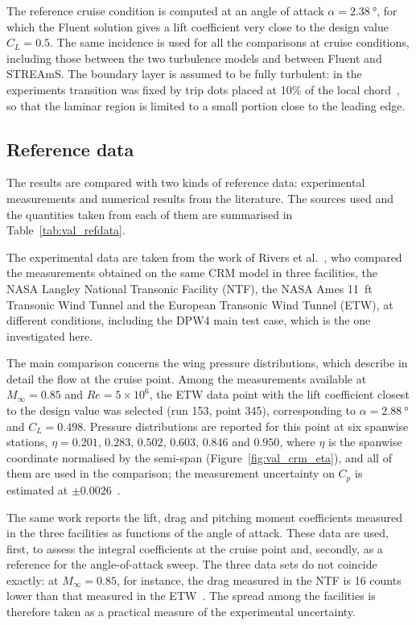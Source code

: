The reference cruise condition is computed at an angle of attack $\alpha = \SI{2.38}{\degree}$, for which the Fluent solution gives a lift coefficient very close to the design value $C_L = 0.5$. The same incidence is used for all the comparisons at cruise conditions, including those between the two turbulence models and between Fluent and STREAmS. The boundary layer is assumed to be fully turbulent: in the experiments transition was fixed by trip dots placed at 10\% of the local chord~\cite{rivers2015}, so that the laminar region is limited to a small portion close to the leading edge.

\subsection{Reference data}
\label{sec:val_refdata}

The results are compared with two kinds of reference data: experimental measurements and numerical results from the literature. The sources used and the quantities taken from each of them are summarised in Table~\ref{tab:val_refdata}.

The experimental data are taken from the work of Rivers et al.~\cite{rivers2015}, who compared the measurements obtained on the same CRM model in three facilities, the NASA Langley National Transonic Facility (NTF), the NASA Ames \SI{11}{ft} Transonic Wind Tunnel and the European Transonic Wind Tunnel (ETW), at different conditions, including the DPW4 main test case, which is the one investigated here. 

The main comparison concerns the wing pressure distributions, which describe in detail the flow at the cruise point. Among the measurements available at $M_\infty = 0.85$ and $Re = 5\times10^{6}$, the ETW data point with the lift coefficient closest to the design value was selected (run 153, point 345), corresponding to $\alpha = \SI{2.88}{\degree}$ and $C_L = 0.498$. Pressure distributions are reported for this point at six spanwise stations, $\eta = 0.201$, $0.283$, $0.502$, $0.603$, $0.846$ and $0.950$, where $\eta$ is the spanwise coordinate normalised by the semi-span (Figure~\ref{fig:val_crm_eta}), and all of them are used in the comparison; the measurement uncertainty on $C_p$ is estimated at $\pm 0.0026$~\cite{rivers2015}.

The same work reports the lift, drag and pitching moment coefficients measured in the three facilities as functions of the angle of attack. These data are used, first, to assess the integral coefficients at the cruise point and, secondly, as a reference for the angle-of-attack sweep. The three data sets do not coincide exactly: at $M_\infty = 0.85$, for instance, the drag measured in the NTF is 16 counts lower than that measured in the ETW~\cite{rivers2015}. The spread among the facilities is therefore taken as a practical measure of the experimental uncertainty.

